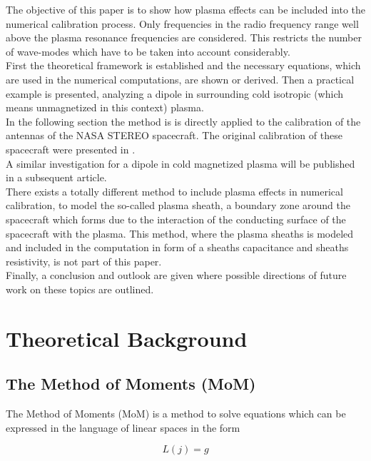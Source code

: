 \documentclass[a4paper,11pt]{article}
\begin{document}
The objective of this paper is to show how plasma effects can be included into the numerical calibration process. Only frequencies in the radio frequency range well above the plasma resonance frequencies are considered. This restricts the number of wave-modes which have to be taken into account considerably.\\

First the theoretical framework is established and the necessary equations, which are used in the numerical computations, are shown or derived. Then a practical example is presented, analyzing a dipole in surrounding cold isotropic (which means unmagnetized in this context) plasma.\\

In the following section the method is is directly applied to the calibration of the antennas of the NASA STEREO spacecraft. The original calibration of these spacecraft were presented in \cite{ossi09}.\\

A similar investigation for a dipole in cold magnetized plasma will be published in a subsequent article.\\

There exists a totally different method to include plasma effects in numerical calibration, to model the so-called plasma sheath, a boundary zone around the spacecraft which forms due to the interaction of the conducting surface of the spacecraft with the plasma. This method, where the plasma sheaths is modeled and included in the computation in form of a sheaths capacitance and sheaths resistivity, is not part of this paper.\\

Finally, a conclusion and outlook are given where possible directions of future work on these topics are outlined.

\section{Theoretical Background}
\subsection{The Method of Moments (MoM)}
The Method of Moments (MoM) is a method to solve equations which can be expressed in the language of linear spaces in the form

\begin{equation}\label{eq:linear_operator}
 L(j)=g
\end{equation}
\end{document}
